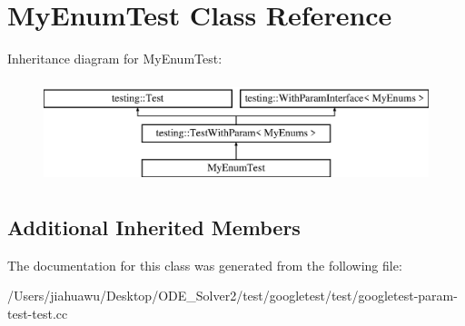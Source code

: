 \hypertarget{class_my_enum_test}{}\section{My\+Enum\+Test Class Reference}
\label{class_my_enum_test}
Inheritance diagram for My\+Enum\+Test\+:\begin{figure}[H]
\begin{center}
\leavevmode
\includegraphics[height=3.000000cm]{class_my_enum_test}
\end{center}
\end{figure}
\subsection*{Additional Inherited Members}


The documentation for this class was generated from the following file\+:\begin{DoxyCompactItemize}
\item 
/\+Users/jiahuawu/\+Desktop/\+O\+D\+E\+\_\+\+Solver2/test/googletest/test/googletest-\/param-\/test-\/test.\+cc\end{DoxyCompactItemize}
